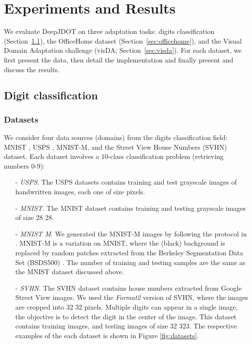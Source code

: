\documentclass[runningheads]{llncs}
\begin{document}
 

\section{Experiments and Results}

We evaluate DeepJDOT on three adaptation tasks: digits classification (Section~\ref{sec:data}), the OfficeHome dataset (Section~\ref{sec:officehome}), and the Visual Domain Adaptation challenge (visDA; Section~\ref{sec:visda}). For each dataset, we first present the data, then detail the implementation and finally present and discuss the results.



\subsection{Digit classification}\label{sec:data}

\subsubsection*{Datasets} We consider four data sources (domains) from the digits classification field: MNIST \cite{Lecun98}, USPS \cite{Hull94}, MNIST-M, and the Street View House Numbers (SVHN) \cite{Netzer11} dataset. Each dataset involves a 10-class classification problem (retrieving numbers 0-9):

\begin{itemize}
\item[-] \emph{USPS}. The USPS datasets contains  training and  test grayscale images of handwritten images, each one of size  pixels.
\item[-] \emph{MNIST}. The MNIST dataset contains  training and  testing grayscale images of size 28  28.
\item[-] \emph{MNIST M}. We generated the MNIST-M images by following the protocol in \cite{Ganin2016}. MNIST-M is a variation on MNIST, where the (black) background is replaced by random patches extracted from the Berkeley Segmentation Data Set (BSDS500) \cite{Arbelaez11}. The number of training and testing samples are the same as the MNIST dataset discussed above.
\item[-] \emph{SVHN}. The SVHN dataset contains house numbers extracted from Google Street View images. We used the \textit{Format2} version of SVHN, where the images are cropped into 32  32 pixels. Multiple digits can appear in a single image, the objective is to detect the digit in the center of the image. This dataset contains  training images, and  testing images of size 32 323. The respective examples of the each dataset is shown in Figure \ref{fig:datasets}.
\end{itemize}
\end{document}
